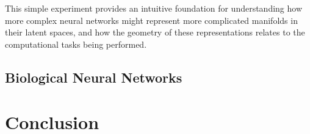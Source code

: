 \documentclass[11pt,a4paper]{article}
\begin{document}
This simple experiment provides an intuitive foundation for understanding how more complex neural networks might represent more complicated manifolds in their latent spaces, and how the geometry of these representations relates to the computational tasks being performed.

\subsection{Biological Neural Networks}

\section{Conclusion}



\end{document}
